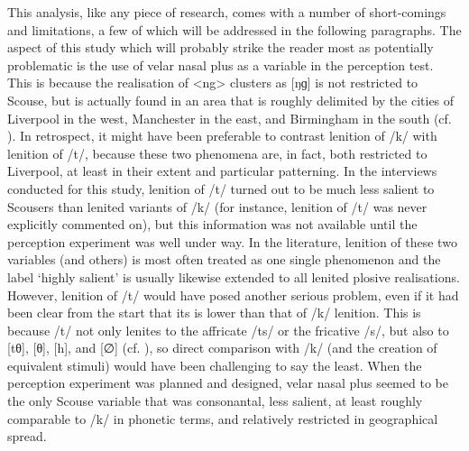 This analysis, like any piece of research, comes with a number of short-comings and limitations, a few of which will be addressed in the following paragraphs.
The aspect of this study which will probably strike the reader most as potentially problematic is the use of velar nasal plus as a variable in the perception test.
This is because the realisation of <ng> clusters as [ŋɡ] is not restricted to Scouse, but is actually found in an area that is roughly delimited by the cities of Liverpool in the west, Manchester in the east, and Birmingham in the south (cf. ).
In retrospect, it might have been preferable to contrast lenition of /k/ with lenition of /t/, because these two phenomena are, in fact, both restricted to Liverpool, at least in their extent and particular patterning.
In the interviews conducted for this study, lenition of /t/ turned out to be much less salient to Scousers than lenited variants of /k/ (for instance, lenition of /t/ was never explicitly commented on), but this information was not available until the perception experiment was well under way.
In the literature, lenition of these two variables (and others) is most often treated as one single phenomenon and the label `highly salient' is usually likewise extended to all lenited plosive realisations.
However, lenition of /t/ would have posed another serious problem, even if it had been clear from the start that its  is lower than that of /k/ lenition.
This is because /t/ not only lenites to the affricate /ts/ or the fricative /s/, but also to [tθ], [θ], [h], and [∅] (cf. ), so direct comparison with /k/ (and the creation of equivalent stimuli) would have been challenging to say the least.
When the perception experiment was planned and designed, velar nasal plus seemed to be the only Scouse variable that was consonantal, less salient, at least roughly comparable to /k/ in phonetic terms, and relatively restricted in geographical spread.

